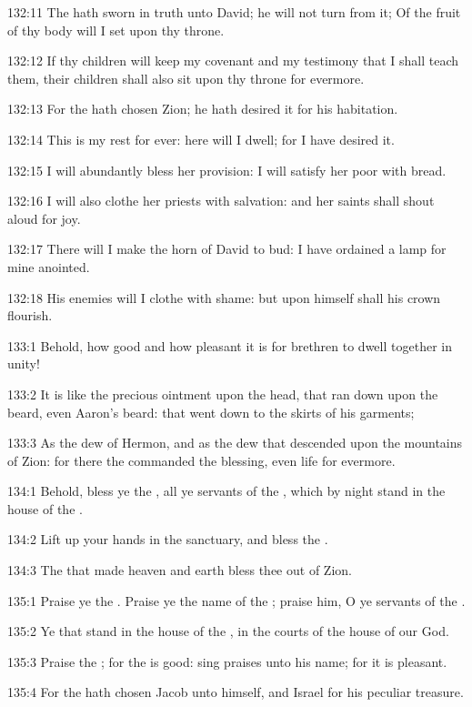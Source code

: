132:11 The \LORD hath sworn in truth unto David; he will not turn from
it; Of the fruit of thy body will I set upon thy throne.

132:12 If thy children will keep my covenant and my testimony that I
shall teach them, their children shall also sit upon thy throne for
evermore.

132:13 For the \LORD hath chosen Zion; he hath desired it for his
habitation.

132:14 This is my rest for ever: here will I dwell; for I have desired
it.

132:15 I will abundantly bless her provision: I will satisfy her poor
with bread.

132:16 I will also clothe her priests with salvation: and her saints
shall shout aloud for joy.

132:17 There will I make the horn of David to bud: I have ordained a
lamp for mine anointed.

132:18 His enemies will I clothe with shame: but upon himself shall
his crown flourish.



133:1 Behold, how good and how pleasant it is for brethren to dwell
together in unity!

133:2 It is like the precious ointment upon the head, that ran down
upon the beard, even Aaron's beard: that went down to the skirts of
his garments;

133:3 As the dew of Hermon, and as the dew that descended upon the
mountains of Zion: for there the \LORD commanded the blessing, even
life for evermore.



134:1 Behold, bless ye the \LORD, all ye servants of the \LORD, which by
night stand in the house of the \LORD.

134:2 Lift up your hands in the sanctuary, and bless the \LORD.

134:3 The \LORD that made heaven and earth bless thee out of Zion.



135:1 Praise ye the \LORD. Praise ye the name of the \LORD; praise him,
O ye servants of the \LORD.

135:2 Ye that stand in the house of the \LORD, in the courts of the
house of our God.

135:3 Praise the \LORD; for the \LORD is good: sing praises unto his
name; for it is pleasant.

135:4 For the \LORD hath chosen Jacob unto himself, and Israel for his
peculiar treasure.

